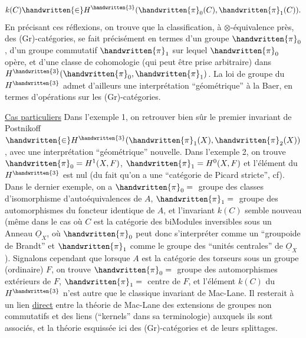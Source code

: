 
\[
k(C)\handwritten{\in}H^{\handwritten{3}}(\handwritten{\pi}_0(C),\handwritten{\pi}_1(C)).
\]
En précisant ces réflexions, on trouve que la classification, à $\otimes$-équivalence près, des (Gr)-catégories, se fait précisément en termes d'un groupe $\handwritten{\pi}_0$, d'un groupe commutatif $\handwritten{\pi}_1$ sur lequel $\handwritten{\pi}_0$ opère, et d'une classe de cohomologie (qui peut être prise arbitraire) dans $H^{\handwritten{3}}(\handwritten{\pi}_0,\handwritten{\pi}_1)$. La loi de  groupe du $H^{\handwritten{3}}$ admet d'ailleurs une interprétation ``géométrique'' à la Baer, en termes d'opérations sur les (Gr)-catégories.

\uline{Cas particuliers} Dans l'exemple 1, on  retrouver bien sûr le premier invariant de Postnikoff $\handwritten{\in}H^{\handwritten{3}}(\handwritten{\pi}_1(X),\handwritten{\pi}_2(X))$, avec une interprétation ``géométrique'' nouvelle. Dans l'exemple 2, on trouve $\handwritten{\pi}_0=H^1(X,F)$, $\handwritten{\pi}_1=H^0(X,F)$\handwritten{,} et l'élément du $H^{\handwritten{3}}$ est nul (du fait qu'on a une ``catégorie de Picard stricte'', cf\handwritten{[~]}). Dans  le dernier exemple, on a $\handwritten{\pi}_0={}$ groupe des classes d'isomorphisme d'autoéquivalences de $A$, $\handwritten{\pi}_1={}$ groupe des automorphismes du foncteur identique de $A$, et l'invariant $k(C)$ semble nouveau (même dans le cas où $C$ est la catégorie des biModules inversibles sous un Anneau $\underline O_X$, où $\handwritten{\pi}_0$ peut donc s'interpréter comme un ``groupoide de Brandt'' et $\handwritten{\pi}_1$ comme le groupe des ``unités centrales'' de $\underline O_X$). Signalons cependant que lorsque $A$ est la catégorie des torseurs sous un groupe (ordinaire) $F$, on trouve  $\handwritten{\pi}_0={}$ groupe des automorphismes extérieurs de $F$, $\handwritten{\pi}_1={}$ centre de $F$, et l'élément $k(C)$ du $H^{\handwritten{3}}$ n'est autre que le classique invariant de Mac-Lane. Il resterait à  un lien  \uline{direct} entre la théorie de Mac-Lane des extensions de groupes non commutatifs\deleted{\unsure{,}} et des liens (``kernels''\deleted{\unsure{)}} dans sa terminologie) auxquels ils sont associés, et la théorie  esquissée ici des (Gr)-catégories et de leurs splittages.

